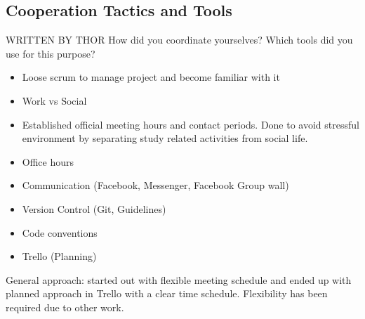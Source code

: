 \subsection{Cooperation Tactics and Tools}
WRITTEN BY THOR 
How did you coordinate yourselves? Which tools did you use for this purpose?

\begin{itemize}
	\item Loose scrum to manage project and become familiar with it
	\item Work vs Social 
	\item Established official meeting hours and contact periods. Done to avoid stressful environment by separating study related activities from social life.
	\item Office hours 
	\item Communication (Facebook, Messenger, Facebook Group wall)
	\item Version Control (Git, Guidelines)
	\item Code conventions 
	\item Trello (Planning) 
\end{itemize}

General approach: started out with flexible meeting schedule and ended up with planned approach in Trello with a clear time schedule. Flexibility has been required due to other work.

